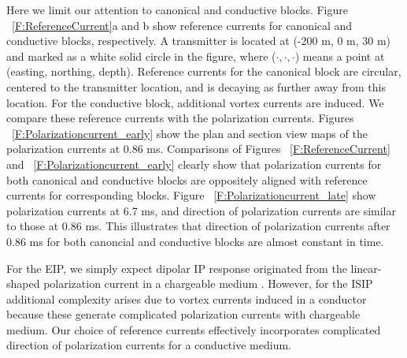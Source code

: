 \documentclass[extra,mreferee]{gji}
\begin{document}
Here we limit our attention to canonical and conductive blocks. 
Figure ~\ref{F:ReferenceCurrent}a and b show reference currents for canonical and conductive blocks, respectively. 
A transmitter is located at (-200 m, 0 m, 30 m) and marked as a white solid circle in the figure, where ($\cdot, \cdot, \cdot$) means a point at (easting, northing, depth).
Reference currents for the canonical block are circular, centered to the transmitter location, and is decaying as further away from this location. 
For the conductive block, additional vortex currents are induced.
We compare these reference currents with the polarization currents. 
Figures ~\ref{F:Polarizationcurrent_early} show the plan and section view maps of the polarization currents at 0.86 ms.
Comparisons of Figures ~\ref{F:ReferenceCurrent} and ~\ref{F:Polarizationcurrent_early} clearly show that polarization currents for both canonical and conductive blocks are oppositely aligned with reference currents for corresponding blocks. 
Figure ~\ref{F:Polarizationcurrent_late} show polarization currents at 6.7 ms, and direction of polarization currents are similar to those at 0.86 ms. 
This illustrates that direction of polarization currents after 0.86 ms for both canoncial and conductive blocks are almost constant in time. 

For the EIP, we simply expect dipolar IP response originated from the linear-shaped polarization current in a chargeable medium \cite[]{seigel1959}. 
However, for the ISIP additional complexity arises due to vortex currents induced in a conductor because these generate complicated polarization currents with chargeable medium. 
Our choice of reference currents effectively incorporates complicated direction of polarization currents for a conductive medium. 
\end{document}
